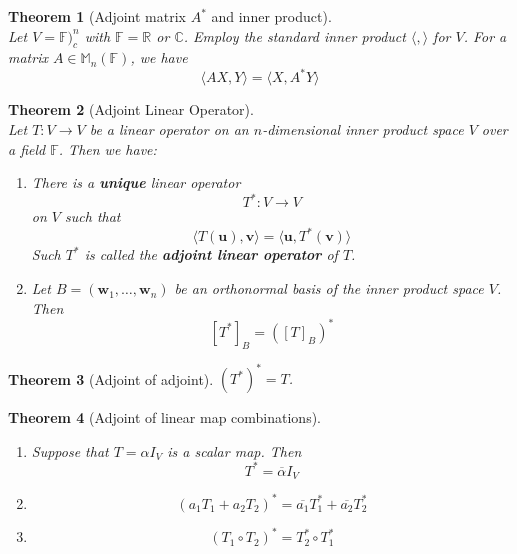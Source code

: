 \documentclass[12pt]{article}
\newtheorem{theorem}{Theorem}[section]
\theoremstyle{definition}
\begin{document}
\begin{theorem}[Adjoint matrix $A^\ast$ and inner product]
\hfill\\\normalfont Let $V=\mathbb{F})_c^n$ with $\mathbb{F}=\mathbb{R}$ or $\mathbb{C}$. Employ the standard inner product $\langle,\rangle$ for $V$. For a matrix $A\in\mathbb{M}_n(\mathbb{F})$, we have
\[
\langle AX,Y\rangle = \langle X,A^\ast Y\rangle
\]
\end{theorem}
\begin{theorem}[Adjoint Linear Operator]
\hfill\\\normalfont Let $T:V\to V$ be a linear operator on an $n$-dimensional inner product space $V$ over a field $\mathbb{F}$. Then we have:
\begin{enumerate}[label=(\arabic*)]
\item There is a \textbf{unique} linear operator
\[
T^\ast:V\to V
\]
on $V$ such that
\[
\langle T(\mathbf{u}), \mathbf{v}\rangle = \langle\mathbf{u},T^\ast(\mathbf{v})\rangle
\]
Such $T^\ast$ is called the \textbf{adjoint linear operator} of $T$.
\item Let $B=(\mathbf{w}_1, \ldots, \mathbf{w}_n)$ be an orthonormal basis of the inner product space $V$. Then
\[
[T^\ast]_B=([T]_B)^\ast
\]
\end{enumerate}
\end{theorem}
\begin{theorem}[Adjoint of adjoint]$(T^\ast)^\ast = T$.
\end{theorem}
\begin{theorem}[Adjoint of linear map combinations]\hfill\\\normalfont
\begin{enumerate}[label=(\arabic*)]
\item Suppose that $T=\alpha I_V$ is a scalar map. Then
\[
T^\ast = \overline{\alpha}I_V 
\]
\item \[
(a_1T_1+a_2T_2)^\ast = \overline{a_1}T_1^\ast +\overline{a_2}T_2^\ast
\]
\item
\[
(T_1\circ T_2)^\ast = T_2^\ast \circ T_1^\ast
\]
\end{enumerate}
\end{theorem}
\end{document}
